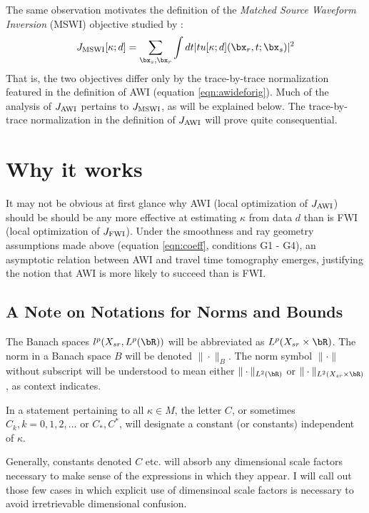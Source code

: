 The same observation motivates the definition of the {\em Matched
  Source Waveform Inversion} (MSWI) objective studied by
\cite{HuangSymes2015SEG,HuangSymes:Geo17}:
\begin{equation}
  \label{eqn:mswideforig}
  J_{\rm MSWI}[\kappa;d] = \sum_{\bx_s,\bx_r} \int dt |tu[\kappa;d](\bx_r,t;\bx_s)|^2
\end{equation}
That is, the two objectives differ only by the trace-by-trace
normalization featured in the definition of AWI (equation
\ref{eqn:awideforig}). Much of the analysis of $J_{\rm AWI}$ pertains to
$J_{\rm MSWI}$, as will be explained below.
The trace-by-trace normalization in the definition of $J_{\rm AWI}$
will prove quite consequential.

\section{Why it works}

It may not be obvious at first glance why AWI (local optimization of
$J_{\rm AWI}$) should be should be any more effective at estimating
$\kappa$ from data $d$ than is FWI (local
optimization of $J_{\rm FWI}$). Under the smoothness and ray geometry assumptions made above (equation
\ref{eqn:coeff}, conditions G1 - G4), an asymptotic relation
between AWI and travel time tomography emerges, justifying the notion
that AWI is more likely to succeed than is FWI.

\subsection{A Note on Notations  for Norms and Bounds}
The Banach spaces
$l^p(X_{sr},L^p(\bR))$ will be abbreviated as $L^p(X_{sr} \times
\bR)$. The norm in a Banach space $B$ will be denoted
$\|\cdot\|_{B}$. The norm symbol
$\|\cdot\|$ without subscript will be understood to mean either
$\|\cdot\|_{L^2(\bR)}$ or $\|\cdot\|_{L^2(X_{sr}\times
  \bR)}$, as context indicates.

In a statement pertaining to all
$\kappa \in M$, the letter $C$, or sometimes $C_k,
k=0,1,2,...$ or
$C_*,C^*$, will designate a constant (or constants) independent of
$\kappa$.

Generally, constants denoted $C$ etc. will absorb any dimensional
scale factors necessary to make sense of the expressions in which they
appear. I will call out those few cases in which explicit use of
dimensinoal scale factors is necessary to avoid irretrievable
dimensional confusion.

